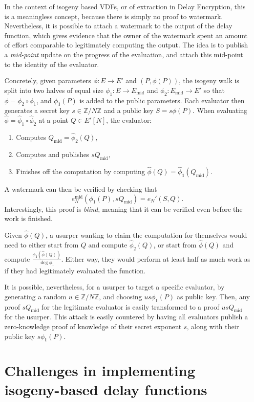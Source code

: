 \documentclass{llncs}
\newcommand{\Z}{\mathbb{Z}}
\newcommand{\Emid}{E_\mathrm{mid}}
\newcommand{\Qmid}{Q_\mathrm{mid}}
\begin{document}
In the context of isogeny based VDFs, or of extraction in Delay
Encryption, this is a meaningless concept, because there is simply no
proof to watermark. %
Nevertheless, it is possible to attach a watermark to the output of
the delay function, which gives evidence that the owner of the
watermark spent an amount of effort comparable to legitimately
computing the output. %
The idea is to publish a \emph{mid-point} update on the progress of
the evaluation, and attach this mid-point to the identity of the
evaluator.

Concretely, given parameters $\phi:E\to E'$ and $(P,\phi(P))$, the
isogeny walk is split into two halves of equal size
$\phi_1:E\to \Emid$ and $\phi_2:\Emid\to E'$ so that
$\phi=\phi_2\circ\phi_1$, and $\phi_1(P)$ is added to the public parameters. %
Each evaluator then generates a secret key $s\in\Z/N\Z$ and a public
key $S = s \phi(P)$. %
When evaluating $\hat\phi=\hat\phi_1\circ\hat\phi_2$ at a point
$Q\in E'[N]$, the evaluator:
\begin{enumerate}
\item Computes $\Qmid=\hat\phi_2(Q)$,
\item Computes and publishes $s\Qmid$,
\item Finishes off the computation by computing
  $\hat\phi(Q)=\hat\phi_1(\Qmid)$.
\end{enumerate}
A watermark can then be verified by checking that
\[e_N^\mathrm{mid}(\phi_1(P),s\Qmid) = e_N'(S,Q).\]
Interestingly, this proof is \emph{blind}, meaning that it can be
verified even before the work is finished.

Given $\hat\phi(Q)$, a usurper wanting to claim the computation for
themselves would need to either start from $Q$ and compute
$\hat\phi_2(Q)$, or start from $\hat\phi(Q)$ and compute
$\frac{\phi_1(\hat\phi(Q))}{\deg\phi_1}$. %
Either way, they would perform at least half as much work as if they
had legitimately evaluated the function.

It is possible, nevertheless, for a usurper to
target a specific evaluator, by generating a random $u\in\Z/N\Z$, and
choosing $us\phi_1(P)$ as public key. %
Then, any proof $s\Qmid$ for the legitimate evaluator is easily
transformed to a proof $us\Qmid$ for the usurper. %
This attack is easily countered by having all evaluators publish a
zero-knowledge proof of knowledge of their secret exponent $s$, along
with their public key $s\phi_1(P)$. %


\section{Challenges in implementing isogeny-based delay functions}
\label{sec:secure-impl-isog}
\end{document}
